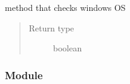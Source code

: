\documentclass[a4paper,10pt,english]{sphinxmanual}
\begin{document}

\begin{fulllineitems}
\label{\detokenize{commands/apidoc/src:src.architecture.is_windows}}
method that checks windows OS
\begin{quote}\begin{description}
\item[{Return type}] \leavevmode
boolean

\end{description}\end{quote}

\end{fulllineitems}



\subsubsection{ Module}
\label{\detokenize{commands/apidoc/src:module-src.compilation}}\label{\detokenize{commands/apidoc/src:compilation-module}}
\end{document}
